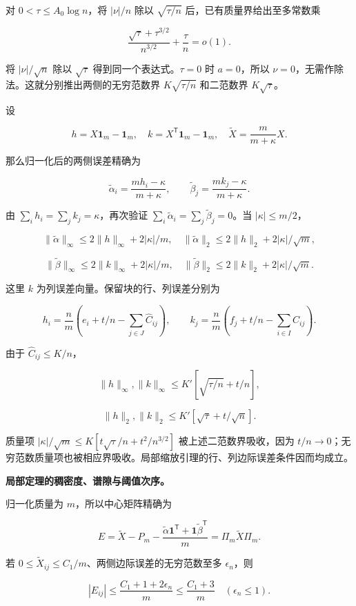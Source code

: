 \documentclass[11pt,a4paper]{article}
\begin{document}
对 \(0<\tau\le A_0\log n\)，将 \(|\nu|/n\) 除以 \(\sqrt{\tau/n}\) 后，已有质量界给出至多常数乘

\[
\frac{\sqrt\tau+\tau^{3/2}}{n^{3/2}}+\frac\tau n=o(1).
\]

将 \(|\nu|/\sqrt n\) 除以 \(\sqrt\tau\) 得到同一个表达式。\(\tau=0\) 时 \(a=0\)，所以 \(\nu=0\)，无需作除法。这就分别推出两侧的无穷范数界 \(K\sqrt{\tau/n}\) 和二范数界 \(K\sqrt\tau\)。

设

\[
h=X\mathbf1_m-\mathbf1_m,\quad
k=X^{\mathsf T}\mathbf1_m-\mathbf1_m,\quad
\widetilde X=\frac m{m+\kappa}X.
\]

那么归一化后的两侧误差精确为

\[
\widetilde\alpha_i=\frac{mh_i-\kappa}{m+\kappa},\qquad
\widetilde\beta_j=\frac{mk_j-\kappa}{m+\kappa}.
\]

由 \(\sum_ih_i=\sum_jk_j=\kappa\)，再次验证 \(\sum_i\widetilde\alpha_i=\sum_j\widetilde\beta_j=0\)。当 \(|\kappa|\le m/2\)，

\[
\|\widetilde\alpha\|_\infty\le2\|h\|_\infty+2|\kappa|/m,
\quad\|\widetilde\alpha\|_2\le2\|h\|_2+2|\kappa|/\sqrt m,
\]

\[
\|\widetilde\beta\|_\infty\le2\|k\|_\infty+2|\kappa|/m,
\quad\|\widetilde\beta\|_2\le2\|k\|_2+2|\kappa|/\sqrt m.
\]

这里 \(k\) 为列误差向量。保留块的行、列误差分别为

\[
h_i=\frac nm\left(e_i+t/n-\sum_{j\in J}\widehat C_{ij}\right),\qquad
k_j=\frac nm\left(f_j+t/n-\sum_{i\in I}\widehat C_{ij}\right).
\]

由于 \(\widehat C_{ij}\le K/n\)，

\[
\|h\|_\infty,\|k\|_\infty\le K'[\sqrt{\tau/n}+t/n],
\]

\[
\|h\|_2,\|k\|_2\le K'[\sqrt\tau+t/\sqrt n].
\]

质量项 \(|\kappa|/\sqrt m\le K[t\sqrt\tau/n+t^2/n^{3/2}]\) 被上述二范数界吸收，因为 \(t/n\to0\)；无穷范数质量项也被相应界吸收。局部缩放引理的行、列边际误差条件因而均成立。

\textbf{局部定理的稠密度、谱隙与阈值次序。}

归一化质量为 \(m\)，所以中心矩阵精确为

\[
E=\widetilde X-P_m-\frac{\widetilde\alpha\mathbf1^{\mathsf T}
+\mathbf1\widetilde\beta^{\mathsf T}}m
=\Pi_m\widetilde X\Pi_m.
\]

若 \(0\le\widetilde X_{ij}\le C_1/m\)、两侧边际误差的无穷范数至多 \(\epsilon_n\)，则

\[
|E_{ij}|\le\frac{C_1+1+2\epsilon_n}{m}\le\frac{C_1+3}{m}
\quad(\epsilon_n\le1).
\]
\end{document}
